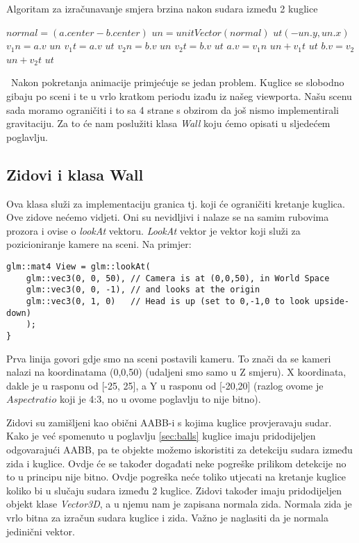 \newpage
\begin{algorithm}
	\caption{Algoritam za izračunavanje smjera brzina nakon sudara između 2 kuglice}
	\label{alg:resolve_collision_1}
	\begin{algorithmic}
			\Return
			\EndIf
			\State $normal = (a.center - b.center)$
			\State $un = unitVector(normal)$
			\State $ut(-un.y,un.x)$
			\State $v_{1}n = a.v$  $un$
			\State $v_{1}t = a.v$ $ut$
			\State $v_{2}n = b.v$ $un$
			\State $v_{2}t = b.v$ $ut$
			\State $a.v = v_{1}n$ $un + v_{1}t$ $ut$
			\State $b.v = v_{2}$ $un + v_{2}t$ $ut$
		\EndFunction
	\end{algorithmic}
\end{algorithm}\
Nakon pokretanja animacije primjećuje se jedan problem. Kuglice se slobodno gibaju po sceni i te u vrlo kratkom periodu izađu iz našeg viewporta. Našu scenu sada moramo ograničiti i to sa 4 strane s obzirom da još nismo implementirali gravitaciju. Za to će nam poslužiti klasa \emph{Wall} koju ćemo opisati u sljedećem poglavlju.

\subsection{Zidovi i klasa Wall}
Ova klasa služi za implementaciju granica tj. koji će ograničiti kretanje kuglica. Ove zidove nećemo vidjeti. Oni su nevidljivi i nalaze se na samim rubovima prozora i ovise o \emph{lookAt} vektoru. \emph{LookAt} vektor je vektor koji služi za pozicioniranje kamere na sceni. Na primjer:\newpage
\begin{lstlisting}[style=myC++, label = {code:10}, caption={Primjer lookAt vektora iz glm knjižnice}]
glm::mat4 View = glm::lookAt(
	glm::vec3(0, 0, 50), // Camera is at (0,0,50), in World Space
	glm::vec3(0, 0, -1), // and looks at the origin
	glm::vec3(0, 1, 0)   // Head is up (set to 0,-1,0 to look upside-down)
	);
}
\end{lstlisting}
Prva linija govori gdje smo na sceni postavili kameru. To znači da se kameri nalazi na koordinatama (0,0,50) (udaljeni smo samo u Z smjeru). X koordinata, dakle je u rasponu od [-25, 25], a Y u rasponu od [-20,20] (razlog ovome je $Aspect ratio$ koji je 4:3, no u ovome poglavlju to nije bitno).

Zidovi su zamišljeni kao obični AABB-i s kojima kuglice provjeravaju sudar. Kako je već spomenuto u poglavlju \ref{sec:balls} kuglice imaju pridodijeljen odgovarajući AABB, pa te objekte možemo iskoristiti za detekciju sudara između zida i kuglice. Ovdje će se također događati neke pogreške prilikom detekcije no to u principu nije bitno. Ovdje pogreška neće toliko utjecati na kretanje kuglice koliko bi u slučaju sudara između 2 kuglice. Zidovi također imaju pridodijeljen objekt klase \emph{Vector3D}, a u njemu nam je zapisana normala zida. Normala zida je vrlo bitna za izračun sudara kuglice i zida. Važno je naglasiti da je normala jedinični vektor.

